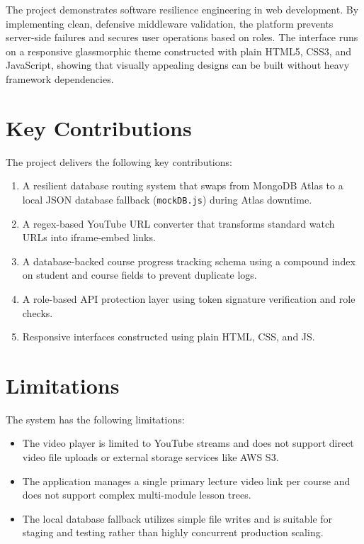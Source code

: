 \documentclass[12pt,a4paper]{report}
\begin{document}
The project demonstrates software resilience engineering in web development. By implementing clean, defensive middleware validation, the platform prevents server-side failures and secures user operations based on roles. The interface runs on a responsive glassmorphic theme constructed with plain HTML5, CSS3, and JavaScript, showing that visually appealing designs can be built without heavy framework dependencies.

\section{Key Contributions}
The project delivers the following key contributions:
\begin{enumerate}
    \item A resilient database routing system that swaps from MongoDB Atlas to a local JSON database fallback (\texttt{mockDB.js}) during Atlas downtime.
    \item A regex-based YouTube URL converter that transforms standard watch URLs into iframe-embed links.
    \item A database-backed course progress tracking schema using a compound index on student and course fields to prevent duplicate logs.
    \item A role-based API protection layer using token signature verification and role checks.
    \item Responsive interfaces constructed using plain HTML, CSS, and JS.
\end{enumerate}

\section{Limitations}
The system has the following limitations:
\begin{itemize}
    \item The video player is limited to YouTube streams and does not support direct video file uploads or external storage services like AWS S3.
    \item The application manages a single primary lecture video link per course and does not support complex multi-module lesson trees.
    \item The local database fallback utilizes simple file writes and is suitable for staging and testing rather than highly concurrent production scaling.
\end{itemize}
\end{document}
